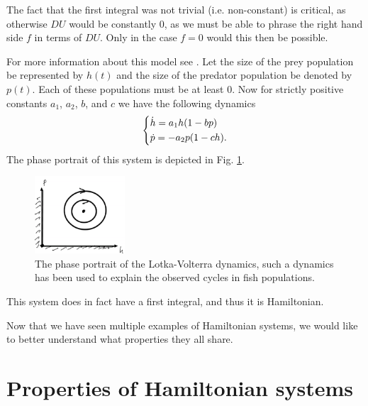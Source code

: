 \begin{remark}[]
	The fact that the first integral was not trivial (i.e. non-constant) is critical, as otherwise $DU$ would be constantly 0, as we must be able to phrase the right hand side $f$ in terms of $DU$. Only in the case $f=0$ would this then be possible.
\end{remark}

\begin{ex}
	For more information about this model see \cite{Lotka1925, Volterra1926}. Let the size of the prey population be represented by $h(t)$ and the size of the predator population be denoted by $p(t)$. Each of these populations must be at least 0. Now for strictly positive constants $a_1$, $a_2$, $b$, and $c$ we have the following dynamics
	\begin{align}
		\begin{dcases}
			\dot{h} = a_1 h(1- bp) \\
			\dot{p} = -a_2 p(1-ch).
		\end{dcases}
	\end{align}
	The phase portrait of this system is depicted in Fig. \ref{fig:lotka_volterra}.
	\begin{figure}[h!]
		\centering
		\includegraphics[width=0.3\textwidth]{figures/ch8/3lotka_volterra.png}
		\caption{The phase portrait of the Lotka-Volterra dynamics, such a dynamics has been used to explain the observed cycles in fish populations.}
		\label{fig:lotka_volterra}
	\end{figure}

	This system does in fact have a first integral, and thus it is Hamiltonian.	
\end{ex}

Now that we have seen multiple examples of Hamiltonian systems, we would like to better understand what properties they all share.

\section{Properties of Hamiltonian systems}
